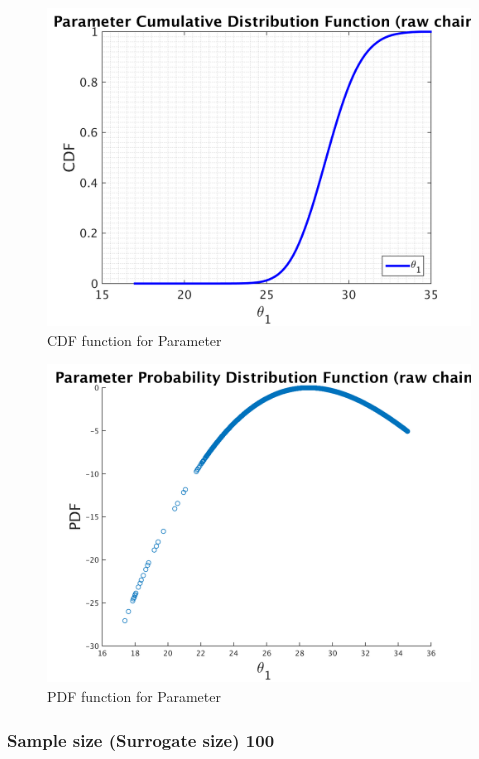 \begin{figure}[H]
  
  \centering
   \includegraphics[scale=0.75]{53_results/output_50/simple_ip_cdf_raw}
   \caption{CDF function for Parameter }
\end{figure}



\begin{figure}[H]
  
  \centering
   \includegraphics[scale=0.75]{53_results/output_50/ip_logLike_unified}
   \caption{PDF function for Parameter }
\end{figure}



\subsubsection{Sample size (Surrogate size) 100 }


